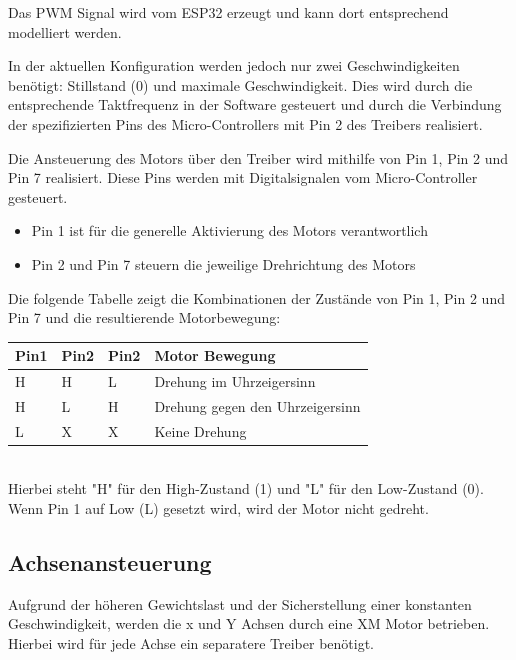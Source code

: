 \documentclass[conference,compsoc,final,a4paper]{IEEEtran}
\begin{document}
\noindent Das PWM Signal wird vom ESP32 erzeugt und kann dort entsprechend modelliert werden. 

\noindent In der aktuellen Konfiguration werden jedoch nur zwei Geschwindigkeiten benötigt: Stillstand (0) und maximale Geschwindigkeit. 
Dies wird durch die entsprechende Taktfrequenz in der Software gesteuert und durch die Verbindung der 
spezifizierten Pins des Micro-Controllers mit Pin 2 des Treibers realisiert.

\noindent Die Ansteuerung des Motors über den Treiber wird mithilfe von Pin 1, Pin 2 und Pin 7 realisiert. 
Diese Pins werden mit Digitalsignalen vom Micro-Controller gesteuert.
\begin{itemize}
  \item Pin 1 ist für die generelle Aktivierung des Motors verantwortlich
  \item Pin 2 und Pin 7 steuern die jeweilige Drehrichtung des Motors
\end{itemize}

\noindent Die folgende Tabelle zeigt die Kombinationen der Zustände von Pin 1, Pin 2 und Pin 7 und die resultierende Motorbewegung:
\begin{table}[]
  \begin{tabular}{llll}
  \textbf{Pin1} & \textbf{Pin2} & \textbf{Pin2} & \textbf{Motor Bewegung}         \\ \hline
  H             & H             & L             & Drehung im Uhrzeigersinn        \\
  H             & L             & H             & Drehung gegen den Uhrzeigersinn \\
  L             & X             & X             & Keine Drehung                   \\ 
  \end{tabular}
\end{table}
\\

\noindent Hierbei steht "H" für den High-Zustand (1) und "L" für den Low-Zustand (0). Wenn Pin 1 auf Low (L) gesetzt wird, wird der Motor nicht gedreht.

\subsection{Achsenansteuerung}

Aufgrund der höheren Gewichtslast und der Sicherstellung einer konstanten Geschwindigkeit, werden die x und Y Achsen durch eine XM Motor betrieben.
Hierbei wird für jede Achse ein separatere Treiber benötigt.
\\
\end{document}
